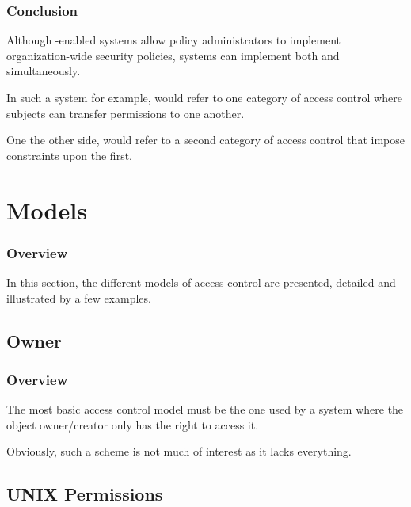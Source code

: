 
\begin{frame}
  \frametitle{Conclusion}

  Although -enabled systems allow policy administrators to
  implement organization-wide security policies, systems can implement both
   and  simultaneously.

  \-

  In such a system for example,  would refer to one category of
  access control where subjects can transfer permissions to one another.

  \-

  One the other side,  would refer to a second category of access
  control that impose constraints upon the first.
\end{frame}

%
%

\section{Models}


\begin{frame}
  \frametitle{Overview}

  In this section, the different models of access control are presented,
  detailed and illustrated by a few examples.
\end{frame}


\subsection{Owner}


\begin{frame}
  \frametitle{Overview}

  The most basic access control model must be the one used by a system where
  the object owner/creator only has the right to access it.

  \-

  Obviously, such a scheme is not much of interest as it lacks everything.
\end{frame}


\subsection{UNIX Permissions}

